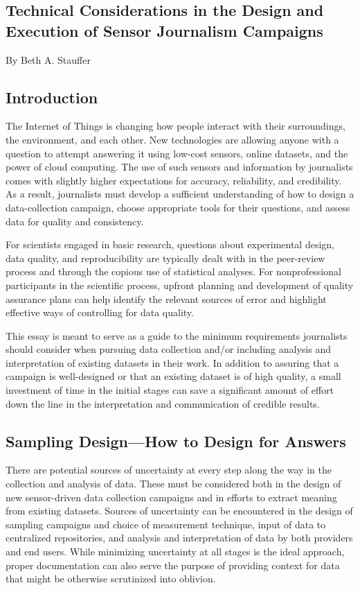 \begin{itemize}
\begin{itemized}
\chapter{Technical Considerations in the Design and Execution of Sensor Journalism Campaigns}
By Beth A. Stauffer
\section{Introduction}
The Internet of Things is changing how people interact with their surroundings,
the environment, and each other. New technologies are allowing anyone
with a question to attempt answering it using low-cost sensors, online
datasets, and the power of cloud computing. The use of such sensors and
information by journalists comes with slightly higher expectations for accuracy,
reliability, and credibility. As a result, journalists must develop a sufficient
understanding of how to design a data-collection campaign, choose
appropriate tools for their questions, and assess data for quality and consistency.

For scientists engaged in basic research, questions about experimental
design, data quality, and reproducibility are typically dealt with in
the peer-review process and through the copious use of statistical analyses.
For nonprofessional participants in the scientific process, upfront planning
and development of quality assurance plans can help identify the relevant
sources of error and highlight effective ways of controlling for data quality.

This essay is meant to serve as a guide to the minimum requirements journalists
should consider when pursuing data collection and/or including
analysis and interpretation of existing datasets in their work. In addition
to assuring that a campaign is well-designed or that an existing dataset is of high quality, a small investment of time in the initial stages can save a
significant amount of effort down the line in the interpretation and communication
of credible results.

\section{Sampling Design—How to Design for Answers}
There are potential sources of uncertainty at every step along the way in
the collection and analysis of data. These must be considered both in the
design of new sensor-driven data collection campaigns and in efforts to
extract meaning from existing datasets. Sources of uncertainty can be
encountered in the design of sampling campaigns and choice of measurement
technique, input of data to centralized repositories, and analysis and
interpretation of data by both providers and end users. While minimizing
uncertainty at all stages is the ideal approach, proper documentation can
also serve the purpose of providing context for data that might be otherwise
scrutinized into oblivion.


\end{itemized}
\end{itemize}
